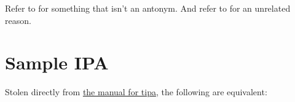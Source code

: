 \documentclass{syntax}
\begin{document}
\begin{exe}
   \label{ex:not-antonym}
   \label{ex:antonym}
\end{exe}

Refer to  for something that isn't an antonym. 
And refer to  for an unrelated reason.

\section{Sample IPA}
Stolen directly from \href{http://www.l.u-tokyo.ac.jp/~fkr/tipa/tipaman.pdf}{the manual for tipa},
the following are equivalent:

\begin{exe}
  \ex {}
  \ex {}
\end{exe}


\end{document}
